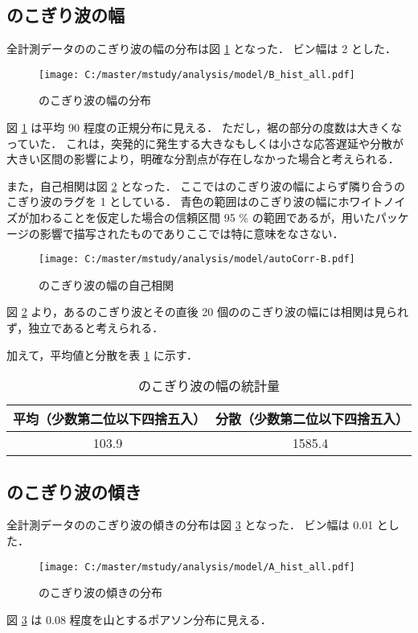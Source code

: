 \documentclass[a4j]{jarticle}
\begin{document}
\subsection{のこぎり波の幅}
全計測データののこぎり波の幅の分布は図 \ref{dist-leng} となった．
ビン幅は 2 とした．
\begin{figure}[tb]
\begin{center}
\texttt{[image: C:/master/mstudy/analysis/model/B\_hist\_all.pdf]}
\caption{のこぎり波の幅の分布}
\label{dist-leng}
\end{center}
\end{figure}
図 \ref{dist-leng} は平均 90 程度の正規分布に見える．
ただし，裾の部分の度数は大きくなっていた．
これは，突発的に発生する大きなもしくは小さな応答遅延や分散が大きい区間の影響により，明確な分割点が存在しなかった場合と考えられる．

また，自己相関は図 \ref{autoCorr-leng} となった．
ここではのこぎり波の幅によらず隣り合うのこぎり波のラグを 1 としている．
青色の範囲はのこぎり波の幅にホワイトノイズが加わることを仮定した場合の信頼区間 95 \% の範囲であるが，用いたパッケージの影響で描写されたものでありここでは特に意味をなさない．
\begin{figure}[tb]
\begin{center}
\texttt{[image: C:/master/mstudy/analysis/model/autoCorr-B.pdf]}
\caption{のこぎり波の幅の自己相関}
\label{autoCorr-leng}
\end{center}
\end{figure}
図 \ref{autoCorr-leng} より，あるのこぎり波とその直後 20 個ののこぎり波の幅には相関は見られず，独立であると考えられる．

加えて，平均値と分散を表 \ref{stat-leng} に示す．
\begin{table}[tb]
\begin{center}
\caption{のこぎり波の幅の統計量}
\label{stat-leng}
\begin{tabular}{|c|c|}
\hline
平均（少数第二位以下四捨五入）&分散（少数第二位以下四捨五入）\\
\hline
103.9&1585.4\\
\hline
\end{tabular}
\end{center}
\end{table}

\subsection{のこぎり波の傾き}
全計測データののこぎり波の傾きの分布は図 \ref{dist-inc} となった．
ビン幅は 0.01 とした．
\begin{figure}[tb]
\begin{center}
\texttt{[image: C:/master/mstudy/analysis/model/A\_hist\_all.pdf]}
\caption{のこぎり波の傾きの分布}
\label{dist-inc}
\end{center}
\end{figure}
図 \ref{dist-inc} は 0.08 程度を山とするポアソン分布に見える．
 
\end{document}
